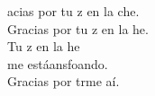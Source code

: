 \begin{cancion}%
	acias por tu z en la che.\\
	Gracias por tu z en la he.\\
	Tu z en la he \\
	me estáansfoando.\\
	Gracias por trme aí.\\
\end{cancion}%
